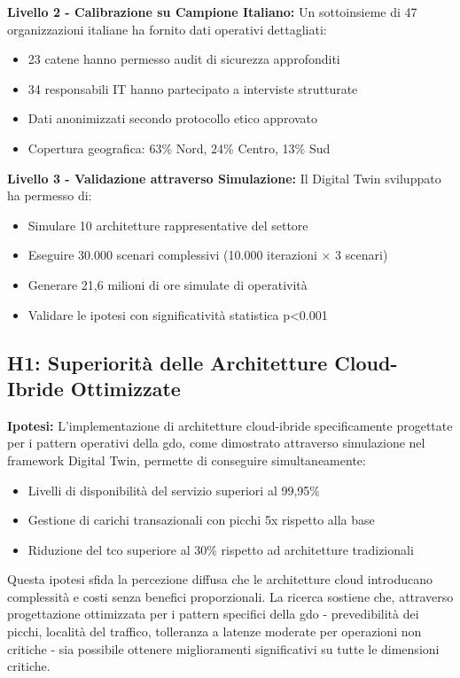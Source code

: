 \textbf{Livello 2 - Calibrazione su Campione Italiano:}
Un sottoinsieme di 47 organizzazioni italiane ha fornito dati operativi dettagliati:
\begin{itemize}
    \item 23 catene hanno permesso audit di sicurezza approfonditi
    \item 34 responsabili IT hanno partecipato a interviste strutturate
    \item Dati anonimizzati secondo protocollo etico approvato
    \item Copertura geografica: 63\% Nord, 24\% Centro, 13\% Sud
\end{itemize}

\textbf{Livello 3 - Validazione attraverso Simulazione:}
Il Digital Twin sviluppato ha permesso di:
\begin{itemize}
    \item Simulare 10 architetture rappresentative del settore
    \item Eseguire 30.000 scenari complessivi (10.000 iterazioni × 3 scenari)
    \item Generare 21,6 milioni di ore simulate di operatività
    \item Validare le ipotesi con significatività statistica p<0.001
\end{itemize}

\subsection{\texorpdfstring{H1: Superiorità delle Architetture Cloud-Ibride Ottimizzate}{1.4.1 - H1: Superiorità delle Architetture Cloud-Ibride Ottimizzate}}
\label{subsec:h1}

\textbf{Ipotesi:} L'implementazione di architetture cloud-ibride specificamente progettate per i pattern operativi della \gls{gdo}, come dimostrato attraverso simulazione nel framework Digital Twin, permette di conseguire simultaneamente:
\begin{itemize}
\item Livelli di disponibilità del servizio superiori al 99,95\%
\item Gestione di carichi transazionali con picchi 5x rispetto alla base
\item Riduzione del \gls{tco} superiore al 30\% rispetto ad architetture tradizionali
\end{itemize}

Questa ipotesi sfida la percezione diffusa che le architetture cloud introducano complessità e costi senza benefici proporzionali. La ricerca sostiene che, attraverso progettazione ottimizzata per i pattern specifici della \gls{gdo} - prevedibilità dei picchi, località del traffico, tolleranza a latenze moderate per operazioni non critiche - sia possibile ottenere miglioramenti significativi su tutte le dimensioni critiche.

